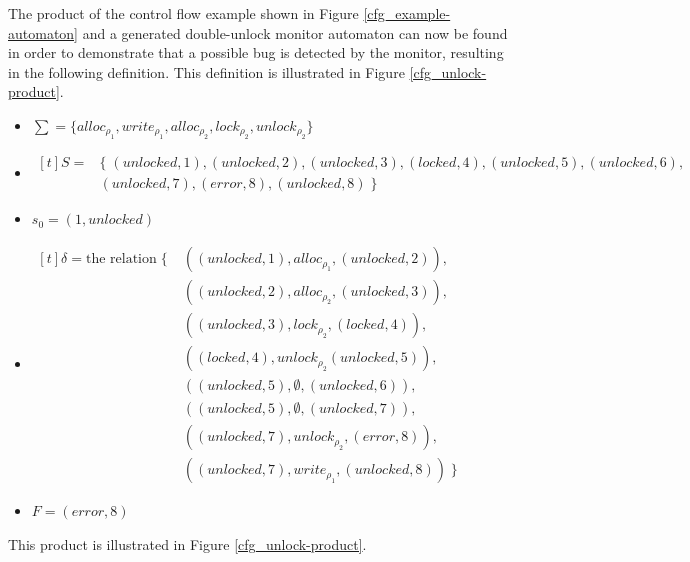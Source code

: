 \newpar The product of the control flow example shown in Figure \ref{cfg_example-automaton} and a generated double-unlock monitor automaton can now be found in order to demonstrate that a possible bug is detected by the monitor, resulting in the following definition. This definition is illustrated in Figure \ref{cfg_unlock-product}. 

\begin{itemize}
    \item{
        $ \sum = \{alloc_{\rho_1}, write_{\rho_1}, alloc_{\rho_2}, lock_{\rho_2}, unlock_{\rho_2}\} $
    }
    \item{
        $
            \begin{aligned}[t]
                S = & \{\;(unlocked, 1), (unlocked, 2), (unlocked, 3), (locked, 4), (unlocked, 5), (unlocked, 6),\\
                & (unlocked, 7), (error, 8), (unlocked, 8) \; \}
            \end{aligned}
        $
    }
    \item $s_0 = (1, unlocked)$ 
    \item {
        $
            \begin{aligned}[t]
            \delta = \text{the relation} \; \{ \; & ((unlocked, 1), alloc_{\rho_1}, (unlocked, 2)), \\
            & ((unlocked, 2), alloc_{\rho_2}, (unlocked, 3)), \\
            & ((unlocked, 3), lock_{\rho_2}, (locked, 4)), \\
            & ((locked, 4), unlock_{\rho_2} (unlocked, 5)), \\
            & ((unlocked, 5), \emptyset, (unlocked, 6)), \\
            & ((unlocked, 5), \emptyset, (unlocked, 7)),\\
            & ((unlocked, 7), unlock_{\rho_2}, (error, 8)), \\
            & ((unlocked, 7), write_{\rho_1}, (unlocked, 8)) \; \}
            \end{aligned}
        $ 
    }
    \item $F = (error, 8)$  
\end{itemize}

\noindent This product is illustrated in Figure \ref{cfg_unlock-product}. 

